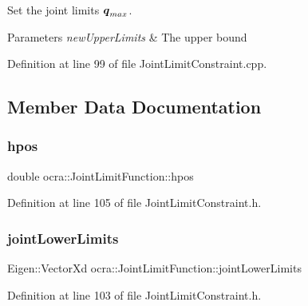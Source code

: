 Set the joint limits $ \mbox{\boldmath${q}$}_{max} $.


\begin{DoxyParams}{Parameters}
{\em new\+Upper\+Limits} & The upper bound \\
\hline
\end{DoxyParams}


Definition at line 99 of file Joint\+Limit\+Constraint.\+cpp.



\subsection{Member Data Documentation}
\hypertarget{classocra_1_1JointLimitFunction_affab56a4cc60a886b51c2ef0644d44ba}{}\label{classocra_1_1JointLimitFunction_affab56a4cc60a886b51c2ef0644d44ba} 
\subsubsection{\texorpdfstring{hpos}{hpos}}
{\footnotesize\ttfamily double ocra\+::\+Joint\+Limit\+Function\+::hpos\hspace{0.3cm}{\ttfamily [protected]}}



Definition at line 105 of file Joint\+Limit\+Constraint.\+h.

\hypertarget{classocra_1_1JointLimitFunction_ab0dbcf53e97b8f4b7a56478bd09240f1}{}\label{classocra_1_1JointLimitFunction_ab0dbcf53e97b8f4b7a56478bd09240f1} 
\subsubsection{\texorpdfstring{joint\+Lower\+Limits}{jointLowerLimits}}
{\footnotesize\ttfamily Eigen\+::\+Vector\+Xd ocra\+::\+Joint\+Limit\+Function\+::joint\+Lower\+Limits\hspace{0.3cm}{\ttfamily [protected]}}



Definition at line 103 of file Joint\+Limit\+Constraint.\+h.

\hypertarget{classocra_1_1JointLimitFunction_a8ea9cd9be8cc3eb55d7d988ba8c5f7e4}{}\label{classocra_1_1JointLimitFunction_a8ea9cd9be8cc3eb55d7d988ba8c5f7e4} 
